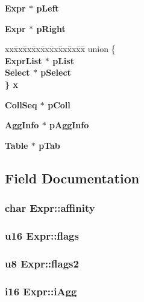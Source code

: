 \begin{CompactItemize}
\begin{tabbing}
\end{tabbing}\item 
\bf{Expr} $\ast$ \bf{p\-Left}
\item 
\bf{Expr} $\ast$ \bf{p\-Right}
\item 
\begin{tabbing}
xx\=xx\=xx\=xx\=xx\=xx\=xx\=xx\=xx\=\kill
union \{\\
\>\bf{ExprList} $\ast$ \bf{pList}\\
\>\bf{Select} $\ast$ \bf{pSelect}\\
\} \bf{x}\\

\end{tabbing}\item 
\bf{Coll\-Seq} $\ast$ \bf{p\-Coll}
\item 
\bf{Agg\-Info} $\ast$ \bf{p\-Agg\-Info}
\item 
\bf{Table} $\ast$ \bf{p\-Tab}
\end{CompactItemize}


\subsection{Field Documentation}
\subsubsection{\setlength{\rightskip}{0pt plus 5cm}char \bf{Expr::affinity}}\label{structExpr_c0d9f55a8d94373d163e59e80908dbc3}


\subsubsection{\setlength{\rightskip}{0pt plus 5cm}\bf{u16} \bf{Expr::flags}}\label{structExpr_db73f0745bd291df2bed0fc580940795}


\subsubsection{\setlength{\rightskip}{0pt plus 5cm}\bf{u8} \bf{Expr::flags2}}\label{structExpr_9b40fb1f352adba16bd4a5cb2a8e4545}


\subsubsection{\setlength{\rightskip}{0pt plus 5cm}\bf{i16} \bf{Expr::i\-Agg}}\label{structExpr_165aa9d64d82e1f939d9e3a576856d1e}


